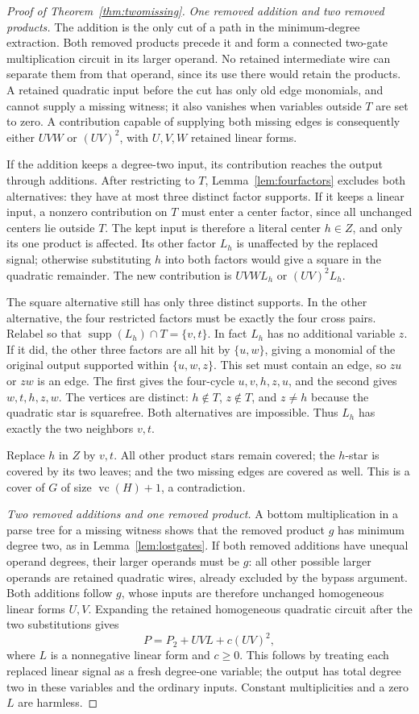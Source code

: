 \documentclass[11pt]{article}
\newcommand{\supp}{\operatorname{supp}}
\newcommand{\vc}{\operatorname{vc}}
\theoremstyle{definition}
\theoremstyle{remark}
\begin{document}
\begin{proof}[Proof of Theorem~\ref{thm:twomissing}]
\emph{One removed addition and two removed products.} The addition is the only cut of a path in the minimum-degree extraction. Both removed products precede it and form a connected two-gate multiplication circuit in its larger operand. No retained intermediate wire can separate them from that operand, since its use there would retain the products. A retained quadratic input before the cut has only old edge monomials, and cannot supply a missing witness; it also vanishes when variables outside $T$ are set to zero. A contribution capable of supplying both missing edges is consequently either $UVW$ or $(UV)^2$, with $U,V,W$ retained linear forms.

If the addition keeps a degree-two input, its contribution reaches the output through additions. After restricting to $T$, Lemma~\ref{lem:fourfactors} excludes both alternatives: they have at most three distinct factor supports. If it keeps a linear input, a nonzero contribution on $T$ must enter a center factor, since all unchanged centers lie outside $T$. The kept input is therefore a literal center $h\in Z$, and only its one product is affected. Its other factor $L_h$ is unaffected by the replaced signal; otherwise substituting $h$ into both factors would give a square in the quadratic remainder. The new contribution is $UVW L_h$ or $(UV)^2L_h$.

The square alternative still has only three distinct supports. In the other alternative, the four restricted factors must be exactly the four cross pairs. Relabel so that $\supp(L_h)\cap T=\{v,t\}$. In fact $L_h$ has no additional variable $z$. If it did, the other three factors are all hit by $\{u,w\}$, giving a monomial of the original output supported within $\{u,w,z\}$. This set must contain an edge, so $zu$ or $zw$ is an edge. The first gives the four-cycle $u,v,h,z,u$, and the second gives $w,t,h,z,w$. The vertices are distinct: $h\notin T$, $z\notin T$, and $z\ne h$ because the quadratic star is squarefree. Both alternatives are impossible. Thus $L_h$ has exactly the two neighbors $v,t$.

Replace $h$ in $Z$ by $v,t$. All other product stars remain covered; the $h$-star is covered by its two leaves; and the two missing edges are covered as well. This is a cover of $G$ of size $\vc(H)+1$, a contradiction.

\emph{Two removed additions and one removed product.} A bottom multiplication in a parse tree for a missing witness shows that the removed product $g$ has minimum degree two, as in Lemma~\ref{lem:lostgates}. If both removed additions have unequal operand degrees, their larger operands must be $g$: all other possible larger operands are retained quadratic wires, already excluded by the bypass argument. Both additions follow $g$, whose inputs are therefore unchanged homogeneous linear forms $U,V$. Expanding the retained homogeneous quadratic circuit after the two substitutions gives
\[
 P=P_2+UVL+c(UV)^2,
\]
where $L$ is a nonnegative linear form and $c\ge0$. This follows by treating each replaced linear signal as a fresh degree-one variable; the output has total degree two in these variables and the ordinary inputs. Constant multiplicities and a zero $L$ are harmless.


\end{proof}
\end{document}
